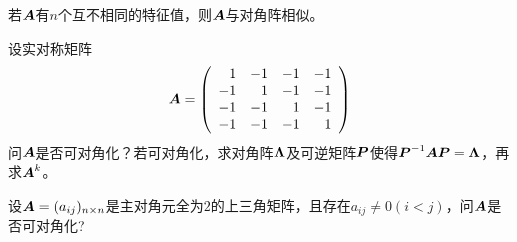 \begin{frame}
  
    \begin{tuilun}
      若$\boldsymbol{A}$有$n$个互不相同的特征值，则$\boldsymbol{A}$与对角阵相似。
    \end{tuilun}
  
\end{frame}

\begin{frame}
  
    \begin{li}
      设实对称矩阵
      $$
      \boldsymbol{A}=\left(
      \begin{array}{rrrr}
        1&-1&-1&-1\\
        -1&1&-1&-1\\
        -1&-1&1&-1\\
        -1&-1&-1&1
      \end{array}
      \right)
      $$
      问$\boldsymbol{A}$是否可对角化？若可对角化，求对角阵$\boldsymbol{\Lambda}$及可逆矩阵$\boldsymbol{P}$使得$\boldsymbol{P}^{-1}\boldsymbol{A}\boldsymbol{P}=\boldsymbol{\Lambda}$，再求$\boldsymbol{A}^k$。
    \end{li}
  
\end{frame}

\begin{frame}
  
    \begin{li}
      设$\boldsymbol{A}=(a_{ij})_{n\times n}$是主对角元全为$2$的上三角矩阵，且存在$a_{ij}\ne 0(i<j)$，问$\boldsymbol{A}$是否可对角化?
    \end{li}
  
\end{frame}
